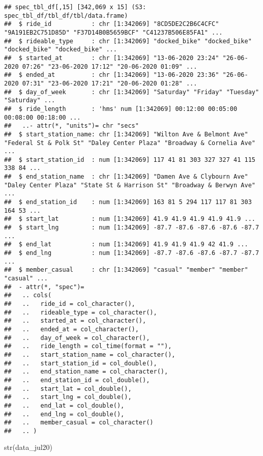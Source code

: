 \documentclass[
]{article}
\newenvironment{Shaded}{\begin{snugshade}}{\end{snugshade}}
\newcommand{\FunctionTok}[1]{\textcolor[rgb]{0.00,0.00,0.00}{#1}}
\newcommand{\NormalTok}[1]{#1}
\begin{document}
\begin{verbatim}
## spec_tbl_df[,15] [342,069 x 15] (S3: spec_tbl_df/tbl_df/tbl/data.frame)
##  $ ride_id           : chr [1:342069] "8CD5DE2C2B6C4CFC" "9A191EB2C751D85D" "F37D14B0B5659BCF" "C41237B506E85FA1" ...
##  $ rideable_type     : chr [1:342069] "docked_bike" "docked_bike" "docked_bike" "docked_bike" ...
##  $ started_at        : chr [1:342069] "13-06-2020 23:24" "26-06-2020 07:26" "23-06-2020 17:12" "20-06-2020 01:09" ...
##  $ ended_at          : chr [1:342069] "13-06-2020 23:36" "26-06-2020 07:31" "23-06-2020 17:21" "20-06-2020 01:28" ...
##  $ day_of_week       : chr [1:342069] "Saturday" "Friday" "Tuesday" "Saturday" ...
##  $ ride_length       : 'hms' num [1:342069] 00:12:00 00:05:00 00:08:00 00:18:00 ...
##   ..- attr(*, "units")= chr "secs"
##  $ start_station_name: chr [1:342069] "Wilton Ave & Belmont Ave" "Federal St & Polk St" "Daley Center Plaza" "Broadway & Cornelia Ave" ...
##  $ start_station_id  : num [1:342069] 117 41 81 303 327 327 41 115 338 84 ...
##  $ end_station_name  : chr [1:342069] "Damen Ave & Clybourn Ave" "Daley Center Plaza" "State St & Harrison St" "Broadway & Berwyn Ave" ...
##  $ end_station_id    : num [1:342069] 163 81 5 294 117 117 81 303 164 53 ...
##  $ start_lat         : num [1:342069] 41.9 41.9 41.9 41.9 41.9 ...
##  $ start_lng         : num [1:342069] -87.7 -87.6 -87.6 -87.6 -87.7 ...
##  $ end_lat           : num [1:342069] 41.9 41.9 41.9 42 41.9 ...
##  $ end_lng           : num [1:342069] -87.7 -87.6 -87.6 -87.7 -87.7 ...
##  $ member_casual     : chr [1:342069] "casual" "member" "member" "casual" ...
##  - attr(*, "spec")=
##   .. cols(
##   ..   ride_id = col_character(),
##   ..   rideable_type = col_character(),
##   ..   started_at = col_character(),
##   ..   ended_at = col_character(),
##   ..   day_of_week = col_character(),
##   ..   ride_length = col_time(format = ""),
##   ..   start_station_name = col_character(),
##   ..   start_station_id = col_double(),
##   ..   end_station_name = col_character(),
##   ..   end_station_id = col_double(),
##   ..   start_lat = col_double(),
##   ..   start_lng = col_double(),
##   ..   end_lat = col_double(),
##   ..   end_lng = col_double(),
##   ..   member_casual = col_character()
##   .. )
\end{verbatim}

\begin{Shaded}
\begin{Highlighting}[]
\FunctionTok{str}\NormalTok{(data\_jul20)}
\end{Highlighting}
\end{Shaded}
\end{document}
